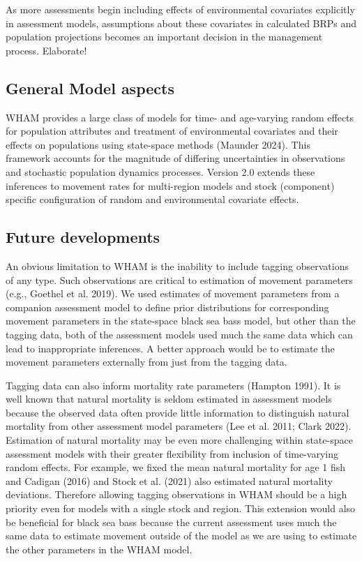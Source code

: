 \documentclass[
]{article}
\begin{document}
As more assessments begin including effects of environmental covariates
explicitly in assessment models, assumptions about these covariates in
calculated BRPs and population projections becomes an important decision
in the management process. Elaborate!

\hypertarget{general-model-aspects}{%
\subsection*{General Model aspects}\label{general-model-aspects}}

WHAM provides a large class of models for time- and age-varying random
effects for population attributes and treatment of environmental
covariates and their effects on populations using state-space methods
(Maunder 2024). This framework accounts for the magnitude of differing
uncertainties in observations and stochastic population dynamics
processes. Version 2.0 extends these inferences to movement rates for
multi-region models and stock (component) specific configuration of
random and environmental covariate effects.

\hypertarget{future-developments}{%
\subsection*{Future developments}\label{future-developments}}

An obvious limitation to WHAM is the inability to include tagging
observations of any type. Such observations are critical to estimation
of movement parameters (e.g., Goethel et al. 2019). We used estimates of
movement parameters from a companion assessment model to define prior
distributions for corresponding movement parameters in the state-space
black sea bass model, but other than the tagging data, both of the
assessment models used much the same data which can lead to
inappropriate inferences. A better approach would be to estimate the
movement parameters externally from just from the tagging data.

Tagging data can also inform mortality rate parameters (Hampton 1991).
It is well known that natural mortality is seldom estimated in
assessment models because the observed data often provide little
information to distinguish natural mortality from other assessment model
parameters (Lee et al. 2011; Clark 2022). Estimation of natural
mortality may be even more challenging within state-space assessment
models with their greater flexibility from inclusion of time-varying
random effects. For example, we fixed the mean natural mortality for age
1 fish and Cadigan (2016) and Stock et al. (2021) also estimated natural
mortality deviations. Therefore allowing tagging observations in WHAM
should be a high priority even for models with a single stock and
region. This extension would also be beneficial for black sea bass
because the current assessment uses much the same data to estimate
movement outside of the model as we are using to estimate the other
parameters in the WHAM model.
\end{document}
